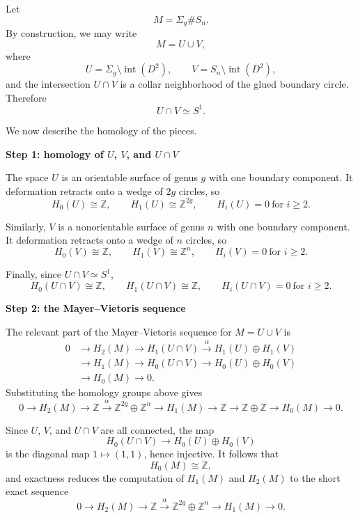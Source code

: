 \begin{solution}
Let
\[
M=\Sigma_g\# S_n.
\]
By construction, we may write
\[
M=U\cup V,
\]
where
\[
U=\Sigma_g\setminus \operatorname{int}(D^2),
\qquad
V=S_n\setminus \operatorname{int}(D^2),
\]
and the intersection \(U\cap V\) is a collar neighborhood of the glued boundary circle. Therefore
\[
U\cap V\simeq S^1.
\]

We now describe the homology of the pieces.


\medskip
\noindent\textbf{Step 1: homology of \(U\), \(V\), and \(U\cap V\)}\par
\smallskip

The space \(U\) is an orientable surface of genus \(g\) with one boundary component. It deformation retracts onto a wedge of \(2g\) circles, so
\[
H_0(U)\cong \mathbb Z,
\qquad
H_1(U)\cong \mathbb Z^{2g},
\qquad
H_i(U)=0\ \text{for }i\ge 2.
\]

Similarly, \(V\) is a nonorientable surface of genus \(n\) with one boundary component. It deformation retracts onto a wedge of \(n\) circles, so
\[
H_0(V)\cong \mathbb Z,
\qquad
H_1(V)\cong \mathbb Z^{n},
\qquad
H_i(V)=0\ \text{for }i\ge 2.
\]

Finally, since \(U\cap V\simeq S^1\),
\[
H_0(U\cap V)\cong \mathbb Z,
\qquad
H_1(U\cap V)\cong \mathbb Z,
\qquad
H_i(U\cap V)=0\ \text{for }i\ge 2.
\]


\medskip
\noindent\textbf{Step 2: the Mayer--Vietoris sequence}\par
\smallskip

The relevant part of the Mayer--Vietoris sequence for \(M=U\cup V\) is
\[
\begin{aligned}
0&\to H_2(M)\to H_1(U\cap V)
\xrightarrow{\alpha}H_1(U)\oplus H_1(V)\\
&\to H_1(M)\to H_0(U\cap V)
\to H_0(U)\oplus H_0(V)\\
&\to H_0(M)\to 0.
\end{aligned}
\]
Substituting the homology groups above gives
\[
0\to H_2(M)\to \mathbb Z
\overset{\alpha}{\longrightarrow}
\mathbb Z^{2g}\oplus \mathbb Z^n
\longrightarrow H_1(M)
\longrightarrow \mathbb Z
\longrightarrow \mathbb Z\oplus \mathbb Z
\longrightarrow H_0(M)\to 0.
\]

Since \(U\), \(V\), and \(U\cap V\) are all connected, the map
\[
H_0(U\cap V)\to H_0(U)\oplus H_0(V)
\]
is the diagonal map \(1\mapsto (1,1)\), hence injective. It follows that
\[
H_0(M)\cong \mathbb Z,
\]
and exactness reduces the computation of \(H_1(M)\) and \(H_2(M)\) to the short exact sequence
\[
0\to H_2(M)\to \mathbb Z
\overset{\alpha}{\longrightarrow}
\mathbb Z^{2g}\oplus \mathbb Z^n
\longrightarrow H_1(M)\to 0.
\]


\end{solution}
